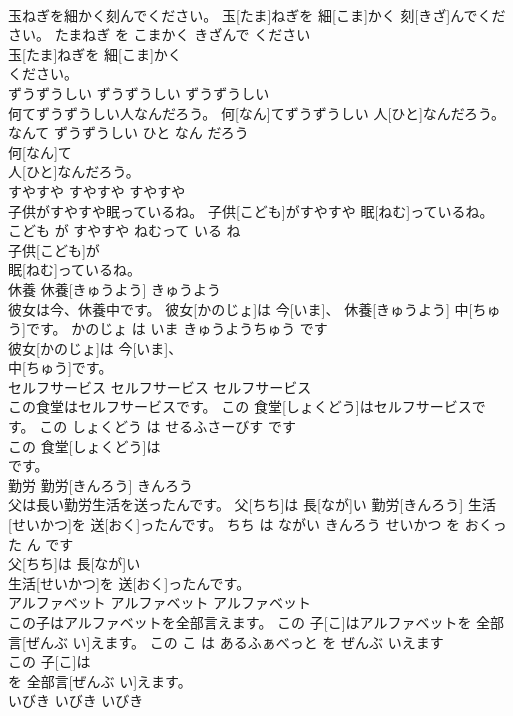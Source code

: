 \documentclass[8pt]{extreport}
\begin{document}
\begin{CJK}{UTF8}{min}
\\	玉ねぎを細かく刻んでください。	玉[たま]ねぎを 細[こま]かく 刻[きざ]んでください。	たまねぎ を こまかく きざんで ください	
\\	玉[たま]ねぎを 細[こま]かく
\\	ください。			
\\	ずうずうしい	ずうずうしい	ずうずうしい	
\\	何てずうずうしい人なんだろう。	何[なん]てずうずうしい 人[ひと]なんだろう。	なんて ずうずうしい ひと なん だろう	
\\	何[なん]て
\\	人[ひと]なんだろう。			
\\	すやすや	すやすや	すやすや	
\\	子供がすやすや眠っているね。	子供[こども]がすやすや 眠[ねむ]っているね。	こども が すやすや ねむって いる ね	
\\	子供[こども]が
\\	眠[ねむ]っているね。			
\\	休養	休養[きゅうよう]	きゅうよう	
\\	彼女は今、休養中です。	彼女[かのじょ]は 今[いま]、 休養[きゅうよう] 中[ちゅう]です。	かのじょ は いま きゅうようちゅう です	
\\	彼女[かのじょ]は 今[いま]、
\\	中[ちゅう]です。			
\\	セルフサービス	セルフサービス	セルフサービス	
\\	この食堂はセルフサービスです。	この 食堂[しょくどう]はセルフサービスです。	この しょくどう は せるふさーびす です	
\\	この 食堂[しょくどう]は
\\	です。			
\\	勤労	勤労[きんろう]	きんろう	
\\	父は長い勤労生活を送ったんです。	父[ちち]は 長[なが]い 勤労[きんろう] 生活[せいかつ]を 送[おく]ったんです。	ちち は ながい きんろう せいかつ を おくった ん です	
\\	父[ちち]は 長[なが]い
\\	生活[せいかつ]を 送[おく]ったんです。			
\\	アルファベット	アルファベット	アルファベット	
\\	この子はアルファベットを全部言えます。	この 子[こ]はアルファベットを 全部言[ぜんぶ い]えます。	この こ は あるふぁべっと を ぜんぶ いえます	
\\	この 子[こ]は
\\	を 全部言[ぜんぶ い]えます。			
\\	いびき	いびき	いびき	

\end{CJK}
\end{document}
